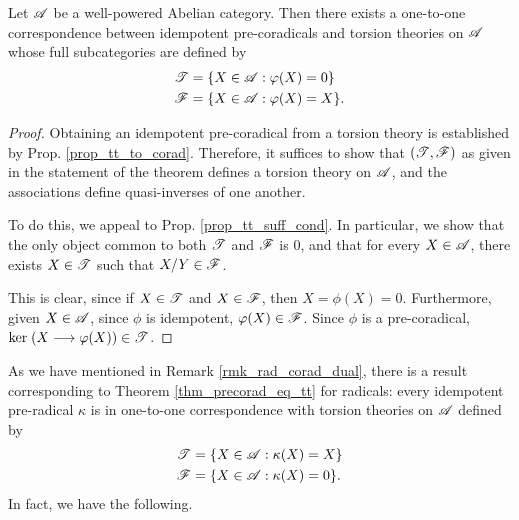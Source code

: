 \begin{thm}\label{thm_precorad_eq_tt}
Let $\mathscr{A}$ be a well-powered Abelian category. Then there exists
a one-to-one correspondence between idempotent pre-coradicals and
torsion theories on $\mathscr{A}$ whose full subcategories are defined 
by
\begin{align*}
\mathscr{T} &= \{ X \in \mathscr{A} : \varphi(X) = 0 \} \\
\mathscr{F} &= \{ X \in \mathscr{A} : \varphi(X) = X \}.
\end{align*}
\end{thm}
\begin{proof}
Obtaining an idempotent pre-coradical from a torsion theory is
established by Prop. \ref{prop_tt_to_corad}. Therefore, it suffices
to show that $(\mathscr{T}, \mathscr{F})$ as given in the statement of the
theorem defines a torsion theory on $\mathscr{A}$, and the associations
define quasi-inverses of one another.

To do this, we appeal to Prop. \ref{prop_tt_suff_cond}. In 
particular, we show that the only object common to both $\mathscr{T}$
and $\mathscr{F}$ is $0$, and that for every $X \in \mathscr{A}$, there 
exists $X \in \mathscr{T}$ such that $X/Y \in \mathscr{F}$.

This is clear, since if $X \in \mathscr{T}$ and $X \in \mathscr{F}$, then
$X = \phi(X) = 0$. Furthermore, given $X \in \mathscr{A}$, since 
$\phi$ is idempotent, $\varphi(X) \in \mathscr{F}$. Since $\phi$ is a 
pre-coradical, $\mathrm{ker}\;(X \longrightarrow \varphi(X)) \in \mathscr{T}$.
\end{proof}

As we have mentioned in Remark \ref{rmk_rad_corad_dual}, there is
a result corresponding to Theorem \ref{thm_precorad_eq_tt} for 
radicals: every idempotent pre-radical $\kappa$ is in one-to-one 
correspondence with torsion theories on $\mathscr{A}$ defined by
\begin{align*}
\mathscr{T} &= \{ X \in \mathscr{A} : \kappa(X) = X \} \\
\mathscr{F} &= \{ X \in \mathscr{A} : \kappa(X) = 0 \}.
\end{align*}
In fact, we have the following.

